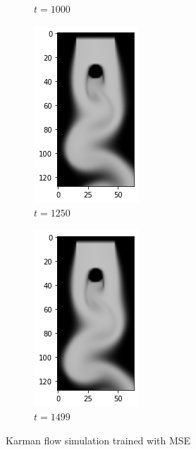 \documentclass[a4paper,12pt,twoside]{report}
\begin{document}
\begin{figure}
\begin{subfigure}{0.18\textwidth}
		\caption{$t=1000$}
	\end{subfigure}
	\begin{subfigure}{0.18\textwidth}
		\centering
		\includegraphics[scale=0.5]{karmanflow/mse_density_001250.png}
		\caption{$t=1250$}
	\end{subfigure}
	\begin{subfigure}{0.18\textwidth}
		\centering
		\includegraphics[scale=0.5]{karmanflow/mse_density_001499.png}
		\caption{$t=1499$}
	\end{subfigure}
	\caption{Karman flow simulation trained with MSE}
	\label{sol karman high mse}
\end{figure}
\end{document}
